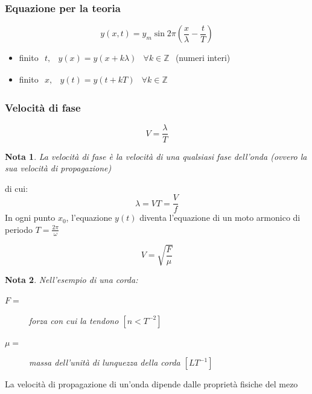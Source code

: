 \documentclass{book}
\newtheorem{nota}{Nota}[section]
\begin{document}
\subsubsection{Equazione per la teoria}
\label{sec:teoonde}

\begin{equation}
  \label{eq:teoonde}
  y(x,t)=y_m\sin2\pi\left(\frac{x}{\lambda}-\frac{t}{T}\right)
\end{equation}
\begin{itemize}
\item finito $
  \begin{matrix}
    t, & y(x)=y(x+k\lambda) & \forall k\in \mathds{Z}
  \end{matrix}
  $ (numeri interi)
\item finito $
  \begin{matrix}
    x, & y(t)=y(t+kT) & \forall k \in \mathds{Z} 
  \end{matrix}
  $
\end{itemize}
\begin{multicols}{2}
  \subsubsection{Velocità di fase}
  \label{sec:velfase}
  \begin{equation}
    \label{eq:velfase}
    V=\frac{\lambda}{T}
  \end{equation}
  \begin{nota}
    La velocità di fase è la velocità di una qualsiasi fase dell'onda ({\color{red}ovvero la sua velocità di propagazione})
  \end{nota}
\end{multicols}
di cui:
\begin{equation*}
  \lambda=VT=\frac{V}{f}
\end{equation*}
In ogni punto $x_0$, l'equazione $y(t)$ diventa l'equazione di un moto armonico di periodo $T=\frac{2\pi}{\omega}$
\begin{multicols}{2}
  \begin{equation*}
    V=\sqrt{\frac{F}{\mu}}
  \end{equation*}
  \begin{nota}
    Nell'esempio di una corda:
    \begin{description}
    \item[$F=$] forza con cui la tendono $\left[n<T^{-2}\right]$
    \item[$\mu=$] massa dell'unità di lunquezza della corda $\left[LT^{-1}\right]$
    \end{description}
  \end{nota}
\end{multicols}
La velocità di propagazione di un'onda dipende dalle proprietà fisiche del mezo
\end{document}
